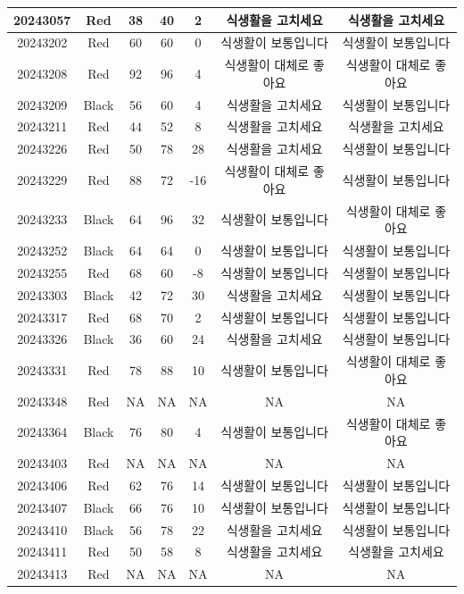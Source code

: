 \documentclass[
]{book}
\begin{document}
\begin{tabular}{c|c|c|c|c|c|c}
\hline
20243057 & Red & 38 & 40 & 2 & 식생활을 고치세요 & 식생활을 고치세요\\
\hline
20243202 & Red & 60 & 60 & 0 & 식생활이 보통입니다 & 식생활이 보통입니다\\
\hline
20243208 & Red & 92 & 96 & 4 & 식생활이 대체로 좋아요 & 식생활이 대체로 좋아요\\
\hline
20243209 & Black & 56 & 60 & 4 & 식생활을 고치세요 & 식생활이 보통입니다\\
\hline
20243211 & Red & 44 & 52 & 8 & 식생활을 고치세요 & 식생활을 고치세요\\
\hline
20243226 & Red & 50 & 78 & 28 & 식생활을 고치세요 & 식생활이 보통입니다\\
\hline
20243229 & Red & 88 & 72 & -16 & 식생활이 대체로 좋아요 & 식생활이 보통입니다\\
\hline
20243233 & Black & 64 & 96 & 32 & 식생활이 보통입니다 & 식생활이 대체로 좋아요\\
\hline
20243252 & Black & 64 & 64 & 0 & 식생활이 보통입니다 & 식생활이 보통입니다\\
\hline
20243255 & Red & 68 & 60 & -8 & 식생활이 보통입니다 & 식생활이 보통입니다\\
\hline
20243303 & Black & 42 & 72 & 30 & 식생활을 고치세요 & 식생활이 보통입니다\\
\hline
20243317 & Red & 68 & 70 & 2 & 식생활이 보통입니다 & 식생활이 보통입니다\\
\hline
20243326 & Black & 36 & 60 & 24 & 식생활을 고치세요 & 식생활이 보통입니다\\
\hline
20243331 & Red & 78 & 88 & 10 & 식생활이 보통입니다 & 식생활이 대체로 좋아요\\
\hline
20243348 & Red & NA & NA & NA & NA & NA\\
\hline
20243364 & Black & 76 & 80 & 4 & 식생활이 보통입니다 & 식생활이 대체로 좋아요\\
\hline
20243403 & Red & NA & NA & NA & NA & NA\\
\hline
20243406 & Red & 62 & 76 & 14 & 식생활이 보통입니다 & 식생활이 보통입니다\\
\hline
20243407 & Black & 66 & 76 & 10 & 식생활이 보통입니다 & 식생활이 보통입니다\\
\hline
20243410 & Black & 56 & 78 & 22 & 식생활을 고치세요 & 식생활이 보통입니다\\
\hline
20243411 & Red & 50 & 58 & 8 & 식생활을 고치세요 & 식생활을 고치세요\\
\hline
20243413 & Red & NA & NA & NA & NA & NA\\

\end{tabular}
\end{document}
